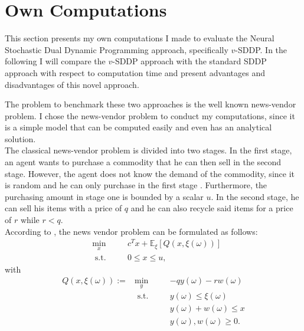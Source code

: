 \section{Own Computations}\label{Own_computations}
This section presents my own computations I made to evaluate the Neural Stochastic Dual Dynamic Programming approach, specifically $v$-SDDP. 
In the following I will compare the $v$-SDDP approach with the standard SDDP approach with respect to computation time and present advantages and disadvantages of this novel approach.

The problem to benchmark these two approaches is the well known news-vendor problem.
I chose the news-vendor problem to conduct my computations, since it is a simple model that can be computed easily and even has an analytical solution. \\
The classical news-vendor problem is divided into two stages.
In the first stage, an agent wants to purchase a commodity that he can then sell in the second stage.
However, the agent does not know the demand of the commodity, since it is random and he can only purchase in the first stage \cite{BirgeLouveaux}.
Furthermore, the purchasing amount in stage one is bounded by a scalar $u$.
In the second stage, he can sell his items with a price of $q$ and he can also recycle said items for a price of $r$ while $r < q$. \\
According to \cite{BirgeLouveaux}, the news vendor problem can be formulated as follows:
\begin{subequations}\label{newsvendor_stufe1}
    \begin{alignat}{3}
          &\min_x        &\quad& c^T x + \mathbb{E}_\xi \left[ Q(x,\xi(\omega))  \right]\\
          &\textrm{ s.t.}  &\quad& 0 \leq x \leq u,
    \end{alignat}
\end{subequations}
with
\begin{subequations}\label{newsvendor_stufe2}
    \begin{alignat}{4}
         Q(x,\xi(\omega)) := & \min_y        &\quad& -qy(\omega) - rw(\omega)  \\
                            & \textrm{ s.t.}&\quad& y(\omega) \leq \xi(\omega)\\
                            &               &\quad& y(\omega) + w(\omega) \leq x \\
                            &               &\quad& y(\omega), w(\omega) \geq0.
    \end{alignat}
\end{subequations}

